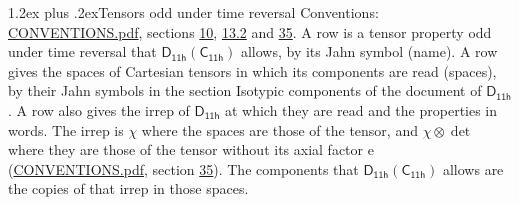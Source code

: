 \documentclass[10pt,a4paper]{article}
\makeatletter
\renewcommand\section{\@startsection{section}{1}{\z@}{-3ex plus -1ex minus -.2ex}%
  {1.2ex plus .2ex}{\normalfont\large\sffamily\bfseries\color{parttitle}}}
\numberwithin{equation}{section}
\newcommand{\grp}[1]{\mathsf{#1}}
\newcommand{\irrprod}{\otimes}
\makeatother
\begin{document}
\section{Tensors odd under time reversal}\label{s:time_odd}
Conventions: \href{../../CONVENTIONS.pdf}{CONVENTIONS.pdf}, sections \href{../../../rotation/CONVENTIONS.pdf\#conv.10}{10}, \href{../../../rotation/CONVENTIONS.pdf\#conv.13.2}{13.2} and \href{../../CONVENTIONS.pdf\#conv.35}{35}.
\leavevmode\label{n:head.name.property}A row is a tensor property odd under time reversal that $\grp{D_{11h}}(\grp{C_{11h}})$ allows, by its Jahn symbol (name). \label{n:head.spaces}A row gives the spaces of Cartesian tensors in which its components are read (spaces), by their Jahn symbols in the section Isotypic components of the document of \href{../../../rotation/data/pdf/D11h.pdf}{$\grp{D_{11h}}$}. \label{n:head.properties}A row also gives the irrep of $\grp{D_{11h}}$ at which they are read and the properties in words. The irrep is $\chi$ where the spaces are those of the tensor, and $\chi \irrprod \det$ where they are those of the tensor without its axial factor e (\href{../../CONVENTIONS.pdf}{CONVENTIONS.pdf}, section \href{../../CONVENTIONS.pdf\#conv.35}{35}). The components that $\grp{D_{11h}}(\grp{C_{11h}})$ allows are the copies of that irrep in those spaces.
\end{document}
